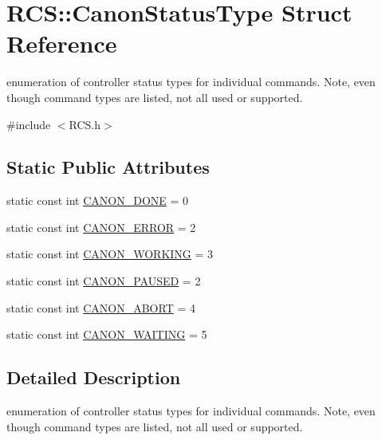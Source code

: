 \hypertarget{structRCS_1_1CanonStatusType}{\section{R\-C\-S\-:\-:Canon\-Status\-Type Struct Reference}
\label{structRCS_1_1CanonStatusType}
}


enumeration of controller status types for individual commands. Note, even though command types are listed, not all used or supported.  




{\ttfamily \#include $<$R\-C\-S.\-h$>$}

\subsection*{Static Public Attributes}
\begin{DoxyCompactItemize}
\item 
static const int \hyperlink{structRCS_1_1CanonStatusType_a0b1749dea0d07b0ac77203715e8e7ca5}{C\-A\-N\-O\-N\-\_\-\-D\-O\-N\-E} = 0
\item 
static const int \hyperlink{structRCS_1_1CanonStatusType_a49205efc1f9461e5f772c5d610875e65}{C\-A\-N\-O\-N\-\_\-\-E\-R\-R\-O\-R} = 2
\item 
static const int \hyperlink{structRCS_1_1CanonStatusType_a81ac63b3c72df61debaa8303a07aed8f}{C\-A\-N\-O\-N\-\_\-\-W\-O\-R\-K\-I\-N\-G} = 3
\item 
static const int \hyperlink{structRCS_1_1CanonStatusType_a3512fd4fa863e04ee26a8adbb52d0690}{C\-A\-N\-O\-N\-\_\-\-P\-A\-U\-S\-E\-D} = 2
\item 
static const int \hyperlink{structRCS_1_1CanonStatusType_a59a689cf99bcc1838eb3a1619f363760}{C\-A\-N\-O\-N\-\_\-\-A\-B\-O\-R\-T} = 4
\item 
static const int \hyperlink{structRCS_1_1CanonStatusType_aeb8aba3e3d0d2acb005e9716cd013b5a}{C\-A\-N\-O\-N\-\_\-\-W\-A\-I\-T\-I\-N\-G} = 5
\end{DoxyCompactItemize}


\subsection{Detailed Description}
enumeration of controller status types for individual commands. Note, even though command types are listed, not all used or supported. 

